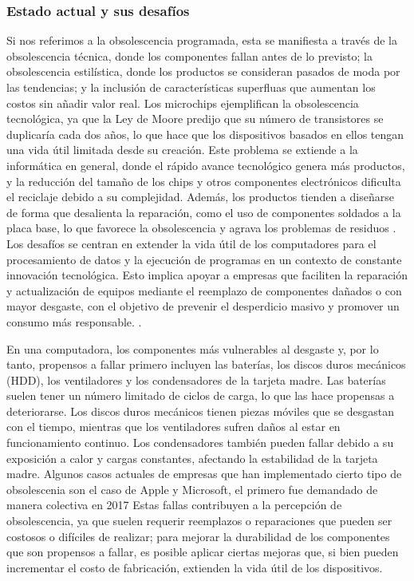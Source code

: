 \documentclass[10pt,journal,compsoc]{IEEEtran}
\begin{document}
\subsubsection{Estado actual y sus desafíos}
Si nos referimos a la obsolescencia programada, esta se manifiesta a través de la obsolescencia
técnica, donde los componentes fallan antes de lo previsto; la obsolescencia estilística, donde los
productos se consideran pasados de moda por las tendencias; y la inclusión de características
superfluas que aumentan los costos sin añadir valor real\cite{maycroft2009consumption}.
Los microchips ejemplifican la obsolescencia tecnológica, ya que la Ley de Moore predijo que su número de transistores se duplicaría cada dos años, lo que hace que los dispositivos basados en ellos tengan una vida útil limitada desde su creación. Este problema se extiende a la informática en general, donde el rápido avance tecnológico genera más productos, y la reducción del tamaño de los chips y otros componentes electrónicos dificulta el reciclaje debido a su complejidad. Además, los productos tienden a diseñarse de forma que desalienta la reparación, como el uso de componentes soldados a la placa base, lo que favorece la obsolescencia y agrava los problemas de residuos \cite{tuominen2021planned}. Los desafíos se centran en extender la vida útil de los computadores para el procesamiento de datos y la ejecución de programas en un contexto de constante innovación tecnológica. Esto implica apoyar a empresas que faciliten la reparación y actualización de equipos mediante el reemplazo de componentes dañados o con mayor desgaste,  con el objetivo de prevenir el desperdicio masivo y promover un consumo más responsable. \cite{lebel2012wasting}.

En una computadora, los componentes más vulnerables al desgaste y, por lo tanto, propensos a fallar primero incluyen las baterías, los discos duros mecánicos (HDD), los ventiladores y los condensadores de la tarjeta madre. Las baterías suelen tener un número limitado de ciclos de carga, lo que las hace propensas a deteriorarse. Los discos duros mecánicos tienen piezas móviles que se desgastan con el tiempo, mientras que los ventiladores sufren daños al estar en funcionamiento continuo. Los condensadores también pueden fallar debido a su exposición a calor y cargas constantes, afectando la estabilidad de la tarjeta madre. Algunos casos actuales de empresas que han implementado cierto tipo de obsolescenia son el caso de Apple y Microsoft, el primero fue demandado de manera colectiva en 2017  Estas fallas contribuyen a la percepción de obsolescencia, ya que suelen requerir reemplazos o reparaciones que pueden ser costosos o difíciles de realizar; para mejorar la durabilidad de los componentes que son propensos a fallar, es posible aplicar ciertas mejoras que, si bien pueden incrementar el costo de fabricación, extienden la vida útil de los dispositivos. 
\end{document}

